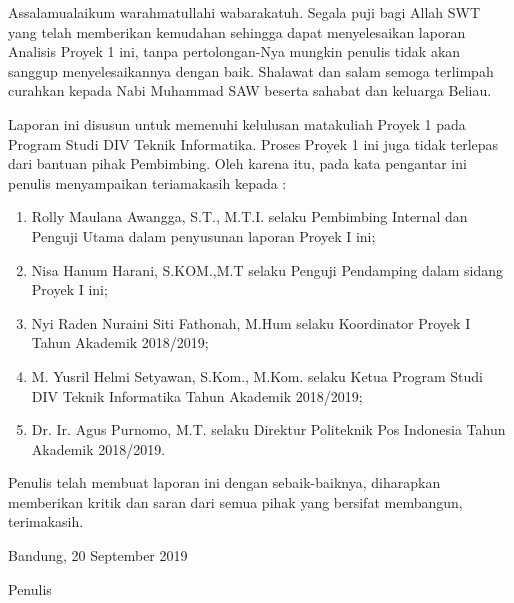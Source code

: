 \begin{acknowledgements}
Assalamualaikum warahmatullahi wabarakatuh. Segala puji bagi Allah SWT yang telah memberikan kemudahan sehingga dapat menyelesaikan laporan Analisis Proyek 1 ini, tanpa pertolongan-Nya mungkin penulis tidak akan sanggup menyelesaikannya dengan baik. Shalawat dan salam semoga terlimpah curahkan kepada Nabi Muhammad SAW beserta sahabat dan keluarga Beliau.

Laporan ini disusun untuk memenuhi kelulusan matakuliah Proyek 1 pada Program Studi DIV Teknik Informatika. Proses Proyek 1 ini juga tidak terlepas dari bantuan pihak Pembimbing. Oleh karena itu, pada kata pengantar ini penulis menyampaikan teriamakasih kepada :
\begin{enumerate}

\item Rolly Maulana Awangga, S.T., M.T.I. selaku Pembimbing Internal dan Penguji Utama dalam penyusunan laporan Proyek I ini;
\item Nisa Hanum Harani, S.KOM.,M.T selaku Penguji Pendamping dalam sidang Proyek I ini;
\item Nyi Raden Nuraini Siti Fathonah, M.Hum selaku Koordinator Proyek I Tahun Akademik 2018/2019;
\item M. Yusril Helmi Setyawan, S.Kom., M.Kom. selaku Ketua Program Studi DIV Teknik Informatika Tahun Akademik 2018/2019;
\item  Dr. Ir. Agus Purnomo, M.T. selaku Direktur Politeknik Pos Indonesia Tahun Akademik 2018/2019.
\end{enumerate}

Penulis telah membuat laporan ini dengan sebaik-baiknya, diharapkan memberikan kritik dan saran dari semua pihak yang bersifat membangun, terimakasih.

\begin{raggedleft}

Bandung, 20 September 2019

Penulis

\end{raggedleft}

\end{acknowledgements}